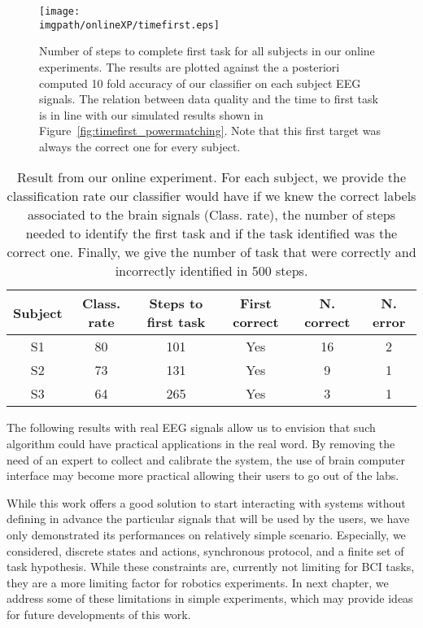 \begin{figure}[!htbp]
\centering
\texttt{[image: \\imgpath/onlineXP/timefirst.eps]}
\caption{Number of steps to complete first task for all subjects in our online experiments. The results are plotted against the a posteriori computed 10 fold accuracy of our classifier on each subject EEG signals. The relation between data quality and the time to first task is in line with our simulated results shown in Figure~\ref{fig:timefirst_powermatching}. Note that this first target was always the correct one for every subject.}
\label{fig:timefirst_online}
\end{figure} 


\begin{table}
\centering
{}
\begin{tabular}{c c c c c c}
    Subject & Class. rate & Steps to first task & First correct & N. correct & N. error\\ \hline
    S1 & 80 & 101 & Yes & 16 & 2\\ 
    S2 & 73 & 131 & Yes & 9 & 1\\
    S3 & 64 & 265 & Yes & 3 & 1\\
\end{tabular}
\caption{Result from our online experiment. For each subject, we provide the classification rate our classifier would have if we knew the correct labels associated to the brain signals (Class. rate), the number of steps needed to identify the first task and if the task identified was the correct one. Finally, we give the number of task that were correctly and incorrectly identified in 500 steps.} 
\label{tab:onlineXPsummary}
\end{table}


\transition

The following results with real EEG signals allow us to envision that such algorithm could have practical applications in the real word. By removing the need of an expert to collect and calibrate the system, the use of brain computer interface may become more practical allowing their users to go out of the labs. 

While this work offers a good solution to start interacting with systems without defining in advance the particular signals that will be used by the users, we have only demonstrated its performances on relatively simple scenario. Especially, we considered, discrete states and actions, synchronous protocol, and a finite set of task hypothesis. While these constraints are, currently not limiting for BCI tasks, they are a more limiting factor for robotics experiments. In next chapter, we address some of these limitations in simple experiments, which may provide ideas for future developments of this work.

